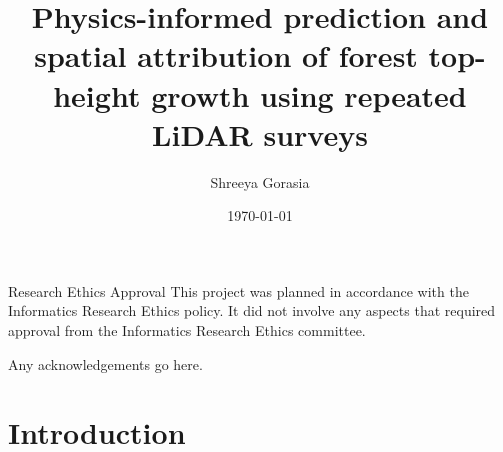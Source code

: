 \documentclass[logo,msc,ai]{infthesis}           %
\begin{document}
\begin{preliminary}

\title{Physics-informed prediction and spatial attribution of forest top-height growth using repeated LiDAR surveys}

\author{Shreeya Gorasia}

\date{\today}



\maketitle

\newenvironment{ethics}
   {\begin{frontenv}{Research Ethics Approval}{\LARGE}}
   {\end{frontenv}\newpage}

\begin{ethics}
This project was planned in accordance with the Informatics Research
Ethics policy. It did not involve any aspects that required approval
from the Informatics Research Ethics committee.

\standarddeclaration
\end{ethics}


\begin{acknowledgements}
Any acknowledgements go here.
\end{acknowledgements}


\tableofcontents
\end{preliminary}

\chapter{Introduction}  \label{ch:intro}
\end{document}
